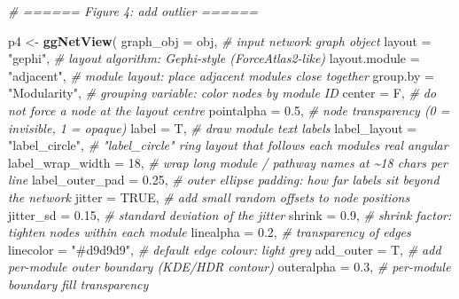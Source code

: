 \documentclass[
]{book}
\newenvironment{Shaded}{\begin{snugshade}}{\end{snugshade}}
\newcommand{\AttributeTok}[1]{\textcolor[rgb]{0.13,0.29,0.53}{#1}}
\newcommand{\CommentTok}[1]{\textcolor[rgb]{0.56,0.35,0.01}{\textit{#1}}}
\newcommand{\ConstantTok}[1]{\textcolor[rgb]{0.56,0.35,0.01}{#1}}
\newcommand{\DecValTok}[1]{\textcolor[rgb]{0.00,0.00,0.81}{#1}}
\newcommand{\FloatTok}[1]{\textcolor[rgb]{0.00,0.00,0.81}{#1}}
\newcommand{\FunctionTok}[1]{\textcolor[rgb]{0.13,0.29,0.53}{\textbf{#1}}}
\newcommand{\NormalTok}[1]{#1}
\newcommand{\OtherTok}[1]{\textcolor[rgb]{0.56,0.35,0.01}{#1}}
\newcommand{\StringTok}[1]{\textcolor[rgb]{0.31,0.60,0.02}{#1}}
\begin{document}
\begin{Shaded}
\begin{Highlighting}[]
\CommentTok{\# ====== Figure 4: add  outlier ======}

\NormalTok{p4 }\OtherTok{\textless{}{-}} \FunctionTok{ggNetView}\NormalTok{(}
  \AttributeTok{graph\_obj        =}\NormalTok{ obj,             }\CommentTok{\# input network graph object}
  \AttributeTok{layout           =} \StringTok{"gephi"}\NormalTok{,         }\CommentTok{\# layout algorithm: Gephi{-}style (ForceAtlas2{-}like)}
  \AttributeTok{layout.module    =} \StringTok{"adjacent"}\NormalTok{,      }\CommentTok{\# module layout: place adjacent modules close together}
  \AttributeTok{group.by         =} \StringTok{"Modularity"}\NormalTok{,    }\CommentTok{\# grouping variable: color nodes by module ID}
  \AttributeTok{center           =}\NormalTok{ F,               }\CommentTok{\# do not force a node at the layout centre}
  \AttributeTok{pointalpha       =} \FloatTok{0.5}\NormalTok{,             }\CommentTok{\# node transparency (0 = invisible, 1 = opaque)}
  \AttributeTok{label            =}\NormalTok{ T,               }\CommentTok{\# draw module text labels}
  \AttributeTok{label\_layout     =} \StringTok{"label\_circle"}\NormalTok{,  }\CommentTok{\# "label\_circle" ring layout that follows each module\textquotesingle{}s real angular}
  \AttributeTok{label\_wrap\_width =} \DecValTok{18}\NormalTok{,              }\CommentTok{\# wrap long module / pathway names at \textasciitilde{}18 chars per line}
  \AttributeTok{label\_outer\_pad  =} \FloatTok{0.25}\NormalTok{,            }\CommentTok{\# outer ellipse padding: how far labels sit beyond the network}
  \AttributeTok{jitter           =} \ConstantTok{TRUE}\NormalTok{,            }\CommentTok{\# add small random offsets to node positions}
  \AttributeTok{jitter\_sd        =} \FloatTok{0.15}\NormalTok{,            }\CommentTok{\# standard deviation of the jitter}
  \AttributeTok{shrink           =} \FloatTok{0.9}\NormalTok{,             }\CommentTok{\# shrink factor: tighten nodes within each module}
  \AttributeTok{linealpha        =} \FloatTok{0.2}\NormalTok{,             }\CommentTok{\# transparency of edges}
  \AttributeTok{linecolor        =} \StringTok{"\#d9d9d9"}\NormalTok{,       }\CommentTok{\# default edge colour: light grey}
  \AttributeTok{add\_outer        =}\NormalTok{ T,               }\CommentTok{\# add per{-}module outer boundary (KDE/HDR contour)}
  \AttributeTok{outeralpha       =} \FloatTok{0.3}\NormalTok{,             }\CommentTok{\# per{-}module boundary fill transparency}

\end{Highlighting}
\end{Shaded}
\end{document}
